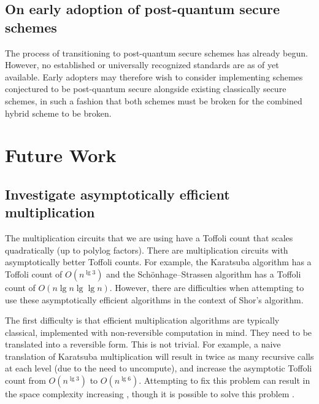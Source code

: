 \documentclass[superscriptaddress,notitlepage,longbibliography]{revtex4-1}
\theoremstyle{definition}
\theoremstyle{definition}
\begin{document}
\subsection{On early adoption of post-quantum secure schemes}
The process of transitioning to post-quantum secure schemes has already begun.
However, no established or universally recognized standards are as of yet available.
Early adopters may therefore wish to consider implementing schemes conjectured to be post-quantum secure  alongside existing classically secure schemes, in such a fashion that both schemes must be broken for the combined hybrid scheme to be broken.









\section{Future Work}
\label{sec:future-work}

\subsection{Investigate asymptotically efficient multiplication}

The multiplication circuits that we are using have a Toffoli count that scales quadratically (up to polylog factors).
There are multiplication circuits with asymptotically better Toffoli counts.
For example, the Karatsuba algorithm \cite{karatsuba1962multiplication} has a Toffoli count of $O(n^{\lg 3})$ and the Schönhage–Strassen algorithm \cite{schonhage1971multiply} has a Toffoli count of $O(n \lg n \lg \lg n)$.
However, there are difficulties when attempting to use these asymptotically efficient algorithms in the context of Shor's algorithm.

The first difficulty is that efficient multiplication algorithms are typically classical, implemented with non-reversible computation in mind.
They need to be translated into a reversible form.
This is not trivial.
For example, a naive translation of Karatsuba multiplication will result in twice as many recursive calls at each level (due to the need to uncompute), and increase the asymptotic Toffoli count from $O(n^{\lg 3})$ to $O(n^{\lg 6})$.
Attempting to fix this problem can result in the space complexity increasing \cite{parent2017karatsuba}, though it is possible to solve this problem \cite{gidney2019karatsuba}.
\end{document}
